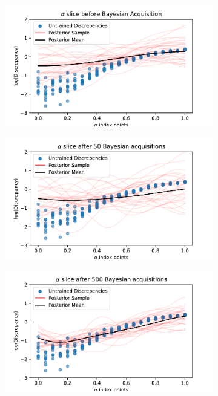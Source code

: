 \begin{figure}[htbp]
    \centering
    \begin{subfigure}[b]{0.33\textwidth}
        \centering
        \includegraphics[width=\textwidth]{../champagne_GP_images/initial_alpha_slice_log_discrep.pdf}
    \end{subfigure}%
    \hfill%
    \begin{subfigure}[b]{0.33\textwidth}
        \centering
        \includegraphics[width=\textwidth]{../champagne_GP_images/alpha_slice_50_bolfi_updates_log_discrep.pdf}
    \end{subfigure}
    \hfill%
    \begin{subfigure}[b]{0.33\textwidth}
        \centering
        \includegraphics[width=\textwidth]{../champagne_GP_images/alpha_slice_500_bolfi_updates_log_discrep.pdf}

\end{subfigure}
\end{figure}
